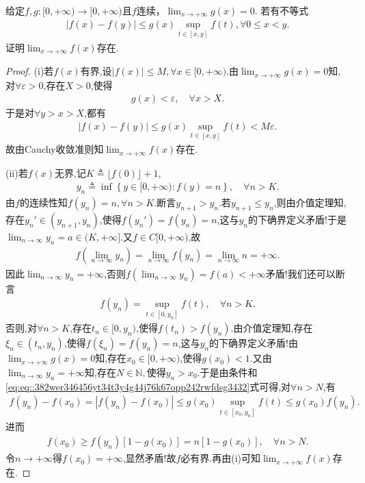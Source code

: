 \documentclass[../../main.tex]{subfiles}%
\begin{document}
\begin{example}
给定$f,g:[0,+\infty) \to [0,+\infty)$且$f$连续，$\lim_{x \to +\infty} g(x) = 0$. 若有不等式
\begin{align*}
|f(x) - f(y)| \leqslant g(x) \sup_{t \in [x,y]} f(t), \forall 0 \leqslant x < y.
\end{align*}
证明$\lim_{x \to +\infty} f(x)$存在.
\end{example}
\begin{proof}

(i)若$f(x)$有界,设$|f(x)| \leqslant M, \forall x \in [0,+\infty)$.由$\lim_{x \to +\infty} g(x) = 0$知,对$\forall \varepsilon > 0$,存在$X > 0$,使得
\begin{align*}
g(x) < \varepsilon, \quad \forall x > X.
\end{align*}
于是对$\forall y > x > X$,都有
\begin{align*}
|f(x) - f(y)| \leqslant g(x) \sup_{t \in [x,y]} f(t) < M\varepsilon.
\end{align*}
故由Cauchy收敛准则知$\lim_{x \to +\infty} f(x)$存在.

(ii)若$f(x)$无界,记$K \triangleq \lfloor f(0) \rfloor + 1$,
\begin{align*}
y_n \triangleq \inf \left\{ y \in [0,+\infty) : f(y) = n \right\},\quad  \forall n > K.
\end{align*}
由$f$的连续性知$f(y_n) = n, \forall n > K$.断言$y_{n+1} > y_n$.若$y_{n+1} \leqslant y_n$,则由介值定理知,存在$y_n' \in (y_{n+1}, y_n)$,使得$f(y_n') = f(y_n) = n$,这与$y_n$的下确界定义矛盾!于是$\lim_{n \to \infty} y_n = a \in (K, +\infty]$.又$f \in C[0,+\infty)$,故
\begin{align*}
f\left( \lim_{n \to \infty} y_n \right) = \lim_{n \to \infty} f(y_n) = \lim_{n \to \infty} n = +\infty.
\end{align*}
因此$\lim_{n \to \infty} y_n = +\infty$,否则$f\left( \lim_{n \to \infty} y_n \right) = f(a) < +\infty$矛盾!我们还可以断言
\begin{align}
f(y_n) = \sup_{t \in [0,y_n]} f(t), \quad \forall n > K. \label{eq:eq::382wer346456yt34t3y4g44j76k67opp242rwfdsg3432}
\end{align}
否则,对$\forall n > K$,存在$t_n \in [0,y_n)$,使得$f(t_n) > f(y_n)$.由介值定理知,存在$\xi_n \in (t_n, y_n)$,使得$f(\xi_n) = f(y_n) = n$,这与$y_n$的下确界定义矛盾!由$\lim_{x\to +\infty}g(x)=0$知,存在$x_0 \in [0,+\infty)$,使得$g(x_0)<1$.又由$\lim_{n\to\infty}y_n=+\infty$知,存在$N\in \mathbb{N},$使得$y_n>x_0$.于是由条件和\eqref{eq:eq::382wer346456yt34t3y4g44j76k67opp242rwfdsg3432}式可得,对$\forall n > N$,有
\begin{align*}
f(y_n) - f(x_0) = |f(y_n) - f(x_0)| \leqslant g(x_0) \sup_{t \in [x_0,y_n]} f(t) \leqslant g(x_0) f(y_n).
\end{align*}
进而
\begin{align*}
f(x_0) \geqslant f(y_n) \left[ 1 - g(x_0) \right] = n \left[ 1 - g(x_0) \right], \quad \forall n > N.
\end{align*}
令$n \to +\infty$得$f(x_0) = +\infty$,显然矛盾!故$f$必有界.再由(i)可知$\lim_{x \to +\infty} f(x)$存在.

\end{proof}
\end{document}
